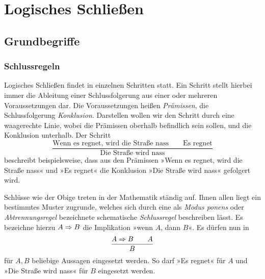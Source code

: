 
\chapter{Logisches Schließen}

\section{Grundbegriffe}

\subsection{Schlussregeln}




Logisches Schließen findet in einzelnen Schritten statt. Ein Schritt
stellt hierbei immer die Ableitung einer Schlussfolgerung aus einer
oder mehreren Voraussetzungen dar. Die Voraussetzungen heißen
\emph{Prämissen}, die Schlussfolgerung
\emph{Konklusion}. Darstellen wollen wir den Schritt
durch eine waagerechte Linie, wobei die Prämissen oberhalb befindlich
sein sollen, und die Konklusion unterhalb. Der Schritt
\[\dfrac{\text{Wenn es regnet, wird die Straße nass}\qquad\text{Es regnet}}
{\text{Die Straße wird nass}}\]
beschreibt beispielsweise, dass aus den Prämissen »Wenn es regnet, wird
die Straße nass« und »Es regnet« die Konklusion »Die Straße wird nass«
gefolgert wird.

Schlüsse wie der Obige treten in der Mathematik ständig auf. Ihnen allen
liegt ein bestimmtes Muster zugrunde, welches sich durch eine als
\emph{Modus ponens} oder
\emph{Abtrennungsregel}
bezeichnete schematische \emph{Schlussregel}
beschreiben lässt. Es bezeichne hierzu $A\Rightarrow B$ die Implikation
»wenn $A$, dann $B$«. Es dürfen nun in
\[\dfrac{A\Rightarrow B\qquad A}{B}\]
für $A,B$ beliebige Aussagen eingesetzt werden. So darf »Es regnet«
für $A$ und »Die Straße wird nass« für $B$ eingesetzt werden.

